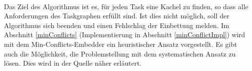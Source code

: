 \ \\
Das Ziel des Algorithmus ist es, für jeden Task eine Kachel zu finden, so dass alle Anforderungen des Taskgraphen erfüllt sind. Ist dies nicht möglich, soll der Algorithmus sich beenden und einen Fehlschlag der Einbettung melden. Im Abschnitt \ref{minConflicts} (Implementierung in Abschnitt \ref{minConflictImpl}) wird mit dem Min-Conflicts-Embedder ein heuristischer  Ansatz vorgestellt. Es gibt auch die Möglichkeit, die Problemstellung mit dem systematischen Ansatz zu lösen. Dies wird in der Quelle \cite{jaeger} näher erläutert.


